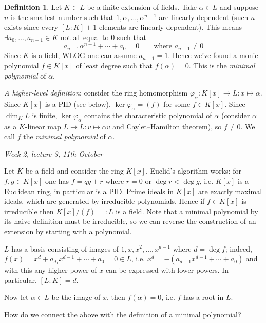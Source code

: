 \documentclass{article}
\theoremstyle{definition}
\newtheorem{defn}{Definition}[subsection]
\begin{document}
\begin{defn}
Let $K\subset L$ be a finite extension of fields. Take $\alpha\in L$ and suppose $n$ is the smallest number such that $1,\alpha,\ldots,\alpha^{n-1}$ are linearly dependent (such $n$ exists since every $[L:K]+1$ elements are linearly dependent). This means $\exists a_0,\ldots,a_{n-1}\in K$ not all equal to 0 such that
\[
a_{n-1}\alpha^{n-1}+\cdots+a_0=0\qquad \text{where } a_{n-1}\neq 0
\]
Since $K$ is a field, WLOG one can assume $a_{n-1}=1$. Hence we've found a monic polynomial $f\in K[x]$ of least degree such that $f(\alpha)=0$. This is the \textit{minimal polynomial} of $\alpha$.

\textit{A higher-level definition}: consider the ring homomorphism $\varphi_\alpha:K[x]\rightarrow L:x\mapsto\alpha$. Since $K[x]$ is a PID (see below), $\ker\varphi_\alpha=(f)$ for some $f\in K[x]$. Since $\dim_KL$ is finite, $\ker\varphi_\alpha$ contains the characteristic polynomial of $\alpha$ (consider $\alpha$ as a $K$-linear map $L\rightarrow L:v\mapsto\alpha v$ and Caylet--Hamilton theorem), so $f\neq 0$. We call $f$ the \textit{minimal polynomial} of $\alpha$.
\end{defn}

\begin{flushright}
\textit{Week 2, lecture 3, 11th October}
\end{flushright}

Let $K$ be a field and consider the ring $K[x]$. Euclid's algorithm works: for $f,g\in K[x]$ one has $f=qg+r$ where $r=0$ or $\deg r<\deg g$, i.e. $K[x]$ is a Euclidean ring, in particular is a PID. Prime ideals in $K[x]$ are exactly maximal ideals, which are generated by irreducible polynomials. Hence if $f\in K[x]$ is irreducible then $K[x]/(f)=:L$ is a field. Note that a minimal polynomial by its naive definition must be irreducible, so we can reverse the construction of an extension by starting with a polynomial.

$L$ has a basis consisting of images of $1,x,x^2,\ldots,x^{d-1}$ where $d=\deg f$; indeed, $f(x)=x^d+a_{d_1}x^{d-1}+\cdots+a_0=0\in L$, i.e. $x^d=-(a_{d-1}x^{d-1}+\cdots+a_0)$ and with this any higher power of $x$ can be expressed with lower powers. In particular, $[L:K]=d$.

Now let $\alpha\in L$ be the image of $x$, then $f(\alpha)=0$, i.e. $f$ has a root in $L$.

How do we connect the above with the definition of a minimal polynomial?
\end{document}

